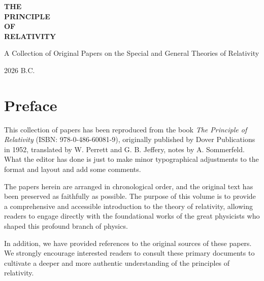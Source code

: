 \documentclass[11pt,oneside]{book}
\newcommand{\collectiontitle}{\Huge{THE\\PRINCIPLE\\OF\\RELATIVITY}}
\newcommand{\collectionsubtitle}{\huge{A Collection of Original Papers on the Special and General Theories of Relativity}}
\newcommand{\collectioneditor}{}
\newcommand{\collectiondate}{2026 B.C.}
\begin{document}
\color{black}

\frontmatter
\begin{titlepage}
    \centering
    \vspace*{3.5cm}
    {\fontsize{24}{30}\selectfont\bfseries\collectiontitle\par}
    \vspace{1.2cm}
    {\Large\collectionsubtitle\par}
    \vspace{2.2cm}
    {\large\collectioneditor\par}
    \vfill
    {\large\collectiondate\par}
    \vspace*{1.5cm}
\end{titlepage}

\chapter*{Preface}
\Large
This collection of papers has been reproduced from the book \textit{The Principle of Relativity} (ISBN: 978-0-486-60081-9), originally published by Dover Publications in 1952, translated by W. Perrett and G. B. Jeffery, notes by A. Sommerfeld. What the editor has done is just to make minor typographical adjustments to the format and layout and add some comments.

The papers herein are arranged in chronological order, and the original text has been preserved as faithfully as possible. The purpose of this volume is to provide a comprehensive and accessible introduction to the theory of relativity, allowing readers to engage directly with the foundational works of the great physicists who shaped this profound branch of physics.

In addition, we have provided references to the original sources of these papers. We strongly encourage interested readers to consult these primary documents to cultivate a deeper and more authentic understanding of the principles of relativity.
\par\normalsize

\restoregeometry


\tableofcontents

\mainmatter











\end{document}
